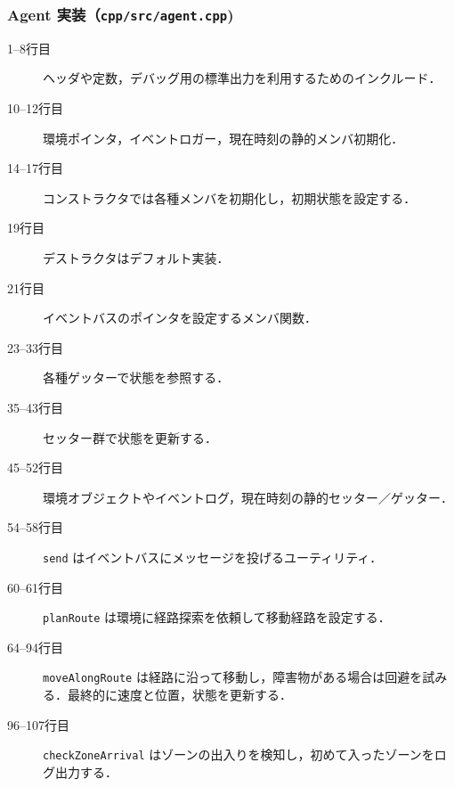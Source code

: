 \documentclass[10pt,letterpaper]{jsarticle}
\begin{document}
\subsubsection{Agent 実装（\texttt{cpp/src/agent.cpp})}

\begin{description}
  \item[1--8行目] ヘッダや定数，デバッグ用の標準出力を利用するためのインクルード．
  \item[10--12行目] 環境ポインタ，イベントロガー，現在時刻の静的メンバ初期化．
  \item[14--17行目] コンストラクタでは各種メンバを初期化し，初期状態を設定する．
  \item[19行目] デストラクタはデフォルト実装．
  \item[21行目] イベントバスのポインタを設定するメンバ関数．
  \item[23--33行目] 各種ゲッターで状態を参照する．
  \item[35--43行目] セッター群で状態を更新する．
  \item[45--52行目] 環境オブジェクトやイベントログ，現在時刻の静的セッター／ゲッター．
  \item[54--58行目] \texttt{send} はイベントバスにメッセージを投げるユーティリティ．
  \item[60--61行目] \texttt{planRoute} は環境に経路探索を依頼して移動経路を設定する．
  \item[64--94行目] \texttt{moveAlongRoute} は経路に沿って移動し，障害物がある場合は回避を試みる．最終的に速度と位置，状態を更新する．
  \item[96--107行目] \texttt{checkZoneArrival} はゾーンの出入りを検知し，初めて入ったゾーンをログ出力する．
\end{description}
\end{document}
